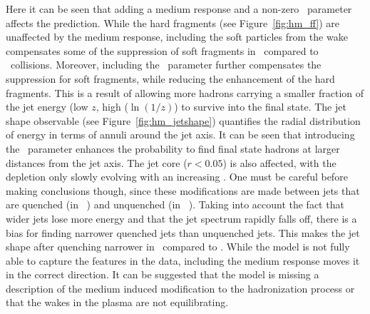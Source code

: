 Here it can be seen that adding a medium response and a non-zero \Lres\ parameter affects the prediction.
While the hard fragments (see Figure~\ref{fig:hm_ff}) are unaffected by the medium response, including the soft particles from the wake compensates some of the suppression of soft fragments in \pbpb\ compared to \pp\ collisions.
Moreover, including the \Lres\ parameter further compensates the suppression for soft fragments, while reducing the enhancement of the hard fragments.
This is a result of allowing more hadrons carrying a smaller fraction of the jet energy (low $z$, high ($\ln(1/z)$) to survive into the final state.
The jet shape observable (see Figure~\ref{fig:hm_jetshape}) quantifies the radial distribution of energy in terms of annuli around the jet axis.
It can be seen that introducing the \Lres\ parameter enhances the probability to find final state hadrons at larger distances from the jet axis.
The jet core ($r < 0.05$) is also affected, with the depletion only slowly evolving with an increasing \Lres.
One must be careful before making conclusions though, since these modifications are made between jets that are quenched (in \pbpb\ ) and unquenched (in \pp\ ).
Taking into account the fact that wider jets lose more energy and that the jet spectrum rapidly falls off, there is a bias for finding narrower quenched jets than unquenched jets.
This makes the jet shape after quenching narrower in \pbpb\ compared to \pp.
While the model is not fully able to capture the features in the data, including the medium response moves it in the correct direction.
It can be suggested that the model is missing a description of the medium induced modification to the hadronization process or that the wakes in the plasma are not equilibrating.









